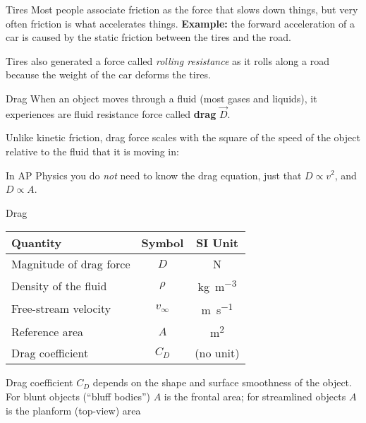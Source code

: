 \documentclass[12pt,compress,aspectratio=169]{beamer}
\begin{document}
\begin{frame}{Tires}
  Most people associate friction as the force that slows down things, but very
  often friction is what accelerates things. \textbf{Example:} the forward
  acceleration of a car is caused by the static friction between the tires and
  the road.
  \begin{center}
  \end{center}
  Tires also generated a force called \emph{rolling resistance} as it rolls
  along a road because the weight of the car deforms the tires.
\end{frame}




\begin{frame}{Drag}
  When an object moves through a fluid (most gases and liquids), it experiences
  are fluid resistance force called \textbf{drag} $\vec D$.
  \begin{center}
  \end{center}
  Unlike kinetic friction, drag force scales with the square of the speed of the
  object relative to the fluid that it is moving in:
  

  \vspace{-.1in}In AP Physics you do \emph{not} need to know the drag equation,
  just that $D\propto v^2$, and $D\propto A$.
\end{frame}



\begin{frame}{Drag}
  \begin{center}
    \begin{tabular}{l|c|c}
      \rowcolor{pink}
      \textbf{Quantity} & \textbf{Symbol} & \textbf{SI Unit} \\ \hline
      Magnitude of drag force & $D$       & \si\newton \\
      Density of the fluid    & $\rho$    & \si{\kilo\gram\per\metre\cubed}\\
      Free-stream velocity    & $v_\infty$ & \si{\metre\per\second}\\
      Reference area          & $A$       & \si{\metre\squared}\\
      Drag coefficient        & $C_D$     & (no unit)
    \end{tabular}
  \end{center}
  Drag coefficient $C_D$ depends on the shape and surface smoothness of the
  object. For blunt objects (``bluff bodies'') $A$ is the frontal area; for
  streamlined objects $A$ is the planform (top-view) area
\end{frame}
\end{document}
